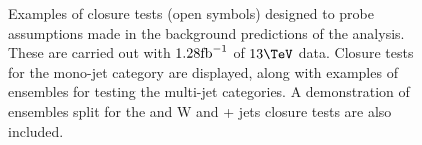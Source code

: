 \begin{figure}[h!]
\begin{center}
    \caption{Examples of closure tests (open symbols) designed to
    probe assumptions made in the background predictions of the
    analysis. These are carried out with $1.28\text{fb}^{-1}$ of $13\tev$ data. 
    Closure tests for the mono-jet category are displayed, along with
    examples of ensembles for testing the multi-jet categories. A
    demonstration of ensembles split for the \znunu and W and \ttbar +
    jets closure tests are also included.
    }
    \label{fig:exampleClosures}
  \end{center} 
\end{figure}




%
